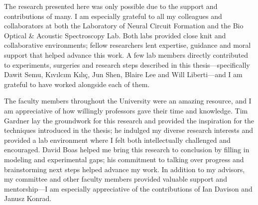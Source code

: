 
The research presented here was only possible due to the support and 
contributions of many. I am especially grateful to all my 
colleagues and collaborators at both the Laboratory of Neural 
Circuit Formation and the Bio Optical \& Acoustic Spectroscopy Lab. 
Both labs provided close knit and collaborative environments; 
fellow researchers lent expertise, guidance and moral support 
that helped advance this work. A few lab members directly contributed 
to experiments, surgeries and research steps described in this 
thesis---specifically Dawit Semu, K{\i}v{\i}lc{\i}m K{\i}l{\i}\c{c}, 
Jun Shen, Blaire Lee and Will Liberti---and I am grateful to have
worked alongside each of them.

The faculty members throughout the University were an amazing resource, and I 
am appreciative of how willingly professors gave their time and 
knowledge. Tim Gardner lay the groundwork for this research and 
provided the inspiration for the techniques introduced in the 
thesis; he indulged my diverse research interests and provided a 
lab environment where I felt both intellectually challenged and 
encouraged. David Boas helped me bring this research to conclusion 
by filling in modeling and experimental gaps; his commitment to 
talking over progress and brainstorming next steps helped advance 
my work. In addition to my advisors, my committee and other 
faculty members provided valuable support and mentorship---I 
am especially appreciative of the contributions of Ian Davison
and Janusz Konrad.




%
%
